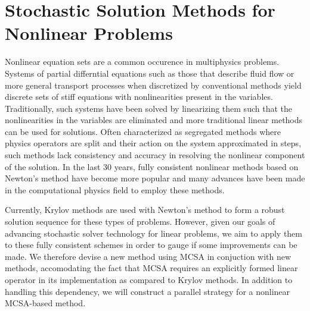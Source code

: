 \chapter{Stochastic Solution Methods for Nonlinear Problems}
\label{ch:nonlinear_problem}
Nonlinear equation sets are a common occurence in multiphysics
problems. Systems of partial differntial equations such as those that
describe fluid flow or more general transport processes when
discretized by conventional methods yield discrete sets of stiff
equations with nonlinearities present in the variables. Traditionally,
such systems have been solved by linearizing them such that the
nonlinearities in the variables are eliminated and more traditional
linear methods can be used for solutions. Often characterized as
segregated methods where physics operators are split and their action
on the system approximated in steps, such methods lack consistency and
accuracy in resolving the nonlinear component of the solution. In the
last 30 years, fully consistent nonlinear methods based on Newton's
method have become more popular and many advances have been made in
the computational physics field to employ these methods.

Currently, Krylov methods are used with Newton's method to form a
robust solution sequence for these types of problems. However, given
our goals of advancing stochastic solver technology for linear
problems, we aim to apply them to these fully consistent schemes in
order to gauge if some improvements can be made. We therefore devise a
new method using MCSA in conjuction with new methods, accomodating the
fact that MCSA requires an explicitly formed linear operator in its
implementation as compared to Krylov methods. In addition to handling
this dependency, we will construct a parallel strategy for a nonlinear
MCSA-based method.


